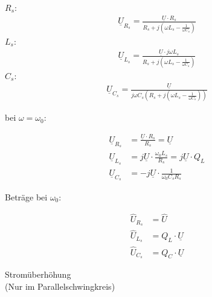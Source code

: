 \documentclass[a4paper, 12pt]{article}
\begin{document}
      $R_s$:
      \begin{gather*}
        \underline{U}_{R_s} = \frac{\underline{U} \cdot R_s}{R_s + j\left( \omega L_s - \frac{1}{\omega C_s} \right)}
      \end{gather*}
      \indent $L_s$:
      \begin{gather*}
        \underline{U}_{L_s} = \frac{\underline{U} \cdot j \omega L_s}{ R_s + j\left( \omega L_s - \frac{1}{\omega C_s} \right)}
      \end{gather*}
      \indent $C_s$:
      \begin{gather*}
        \underline{U}_{C_s} = \frac{\underline{U}}{ j \omega C_s\left(R_s + j\left( \omega L_s - \frac{1}{\omega C_s} \right)\right)}
      \end{gather*}

      bei $\omega = \omega_0$:

      \begin{align*}
        \underline{U}_{R_s} &= \frac{\underline{U} \cdot R_s}{R_s} = \underline{U}\\
        \underline{U}_{L_s} &= j \underline{U} \cdot \frac{ \omega_0 L_s}{R_s} = j \underline{U} \cdot Q_L\\
        \underline{U}_{C_s} &= -j \underline{U} \cdot \frac{1}{ \omega_0 C_s R_s}
      \end{align*}

      Beträge bei $\omega_0$:

      \begin{align*}
        \hat{U}_{R_s} &= \hat{U}\\
        \hat{U}_{L_s} &= Q_L \cdot \underline{U}\\
        \hat{U}_{C_s} &= Q_C \cdot \underline{U}
      \end{align*}

    \begin{center}
      \large Stromüberhöhung\\
      \small (Nur im Parallelschwingkreis)
    \end{center}
\end{document}
